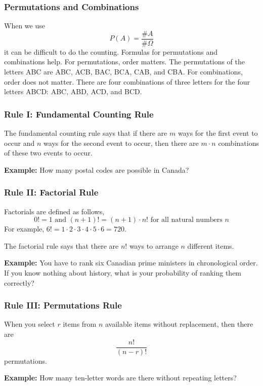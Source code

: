 \documentclass[xcolor=dvipsnames]{beamer}
\begin{document}
\begin{frame}
  \frametitle{Permutations and Combinations}
When we use
\begin{equation}
  \label{eq:adeiquah}
  P(A)=\frac{\#A}{\#\Omega}
\end{equation}
it can be difficult to do the counting. Formulas for permutations and
combinations help. For \alert{permutations}, order matters. The
permutations of the letters ABC are ABC, ACB, BAC, BCA, CAB, and CBA.
For \alert{combinations}, order does not matter. There are four
combinations of three letters for the four letters ABCD: ABC, ABD,
ACD, and BCD.
\end{frame}

\begin{frame}
  \frametitle{Rule I: Fundamental Counting Rule}
  The fundamental counting rule says that if there are $m$ ways for
  the first event to occur and $n$ ways for the second event to occur,
  then there are $m\cdot{}n$ combinations of these two events to
  occur.

\bigskip

\textbf{Example:} How many postal codes are possible in Canada?
\end{frame}

\begin{frame}
  \frametitle{Rule II: Factorial Rule}
Factorials are defined as follows,
\begin{equation}
  \label{eq:iepeejae}
  0!=1\mbox{ and }(n+1)!=(n+1)\cdot{}n!\mbox{ for all natural numbers }n
\end{equation}
For example, $6!=1\cdot{}2\cdot{}3\cdot{}4\cdot{}5\cdot{}6=720$.

\bigskip

The factorial rule says that there are $n!$ ways to arrange $n$
different items.

\bigskip

\textbf{Example:} You have to rank six Canadian prime ministers in
chronological order. If you know nothing about history, what is your
probability of ranking them correctly?
\end{frame}

\begin{frame}
  \frametitle{Rule III: Permutations Rule}
When you select $r$ items from $n$ available items \alert{without
  replacement}, then there are
\begin{equation}
  \label{eq:eahaikee}
  \frac{n!}{(n-r)!}
\end{equation}
permutations.

\bigskip

\textbf{Example:} How many ten-letter words are there without
repeating letters?
\end{frame}
\end{document}
